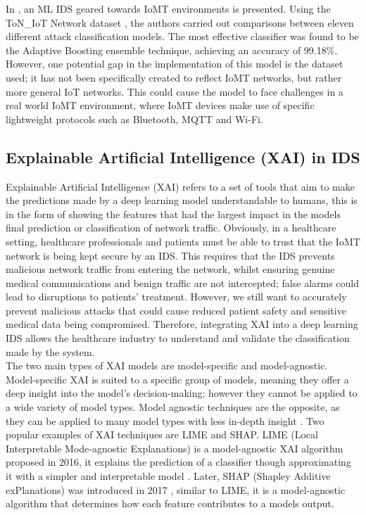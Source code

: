 \documentclass[11pt,a4paper]{article}
\begin{document}
In \cite{kulshresthap}, an ML IDS geared towards IoMT environments is presented. Using the ToN\_IoT Network dataset \cite{toniotdataset}, the authors carried out comparisons between eleven different attack classification models. The most effective classifier was found to be the Adaptive Boosting ensemble technique, achieving an accuracy of 99.18\%. However, one potential gap in the implementation of this model is the dataset used; it has not been specifically created to reflect IoMT networks, but rather more general IoT networks. This could cause the model to face challenges in a real world IoMT environment, where IoMT devices make use of specific lightweight protocols such as Bluetooth, MQTT and Wi-Fi.


\subsection{Explainable Artificial Intelligence (XAI) in IDS}
Explainable Artificial Intelligence (XAI) refers to a set of tools that aim to make the predictions made by a deep learning model understandable to humans, this is in the form of showing the features that had the largest impact in the models final prediction or classification of network traffic. 
Obviously, in a healthcare setting, healthcare professionals and patients must be able to trust that the IoMT network is being kept secure by an IDS. 
This requires that the IDS prevents malicious network traffic from entering the network, whilst ensuring genuine medical communications and benign traffic are not intercepted; false alarms could lead to disruptions to patients’ treatment. 
However, we still want to accurately prevent malicious attacks that could cause reduced patient safety and sensitive medical data being compromised. Therefore, integrating XAI into a deep learning IDS allows the healthcare industry to understand and validate the classification made by the system.
\\
The two main types of XAI models are model-specific and model-agnostic. Model-specific XAI is suited to a specific group of models, meaning they offer a deep insight into the model's decision-making; however they cannot be applied to a wide variety of model types. Model agnostic techniques are the opposite, as they can be applied to many model types with less in-depth insight \cite{devireddy2025comparative}.
Two popular examples of XAI techniques are LIME and SHAP. LIME (Local Interpretable Mode-agnostic Explanations) is a model-agnostic XAI algorithm proposed in 2016, it explains the prediction of a classifier though approximating it with a simpler and interpretable model \cite{ribeiro2016should}. Later, SHAP (Shapley Additive exPlanations) was introduced in 2017 \cite{lundberg2017unified}, similar to LIME, it is a model-agnostic algorithm that determines how each feature contributes to a models output. 
\end{document}
